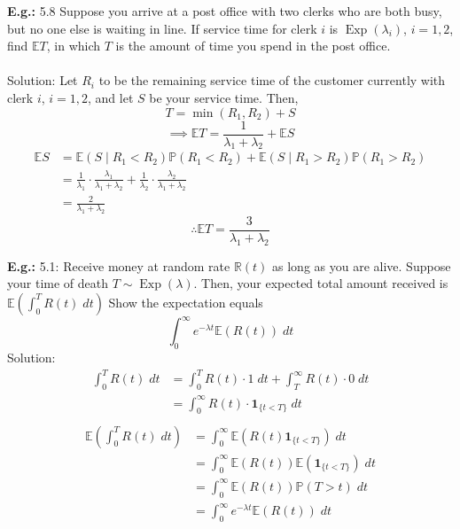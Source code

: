 \documentclass[a4paper]{article}
\newcommand{\n}{\hfill\break}
\newcommand{\eg}[1]{\par\noindent\settowidth{\hangindent}{\textbf{E.g.: }}\textbf{E.g.: }#1\n}
\newcommand{\reals}{\mathbb{R}}
\newcommand{\R}{\reals}
\newcommand{\Prob}{\mathbb{P}}
\renewcommand{\P}{\Prob}
\newcommand{\Avg}{\mathbb{E}}
\newcommand{\E}{\Avg}
\DeclareMathOperator{\Exp}{\text{Exp}}
\begin{document}
\eg{
5.8 Suppose you arrive at a post office with two clerks who are both busy, but no one else is waiting in line. If service time for clerk $i$ is $\Exp(\lambda_i)$, $i=1, 2$, find $\E T$, in which $T$ is the amount of time you spend in the post office.
\\\\
Solution: Let $R_i$ to be the remaining service time of the customer currently with clerk $i$, $i=1,2$, and let $S$ be your service time. Then, 
\[T=\min(R_1, R_2)+S\]
\[\implies\E T=\frac{1}{\lambda_1+\lambda_2}+\E S\]
\begin{align*}
    \E S&=\E(S\mid R_1<R_2)\P(R_1<R_2)+\E(S\mid R_1>R_2)\P(R_1>R_2) \\
    &=\frac{1}{\lambda_1}\cdot\frac{\lambda_1}{\lambda_1+\lambda_2}+\frac{1}{\lambda_2}\cdot\frac{\lambda_2}{\lambda_1+\lambda_2} \\
    &=\frac{2}{\lambda_1+\lambda_2}
\end{align*}
\[\therefore \E T=\frac{3}{\lambda_1+\lambda_2}\]
}

\eg{
5.1: Receive money at random rate $\R(t)$ as long as you are alive. Suppose your time of death $T\sim\Exp(\lambda)$. Then, your expected total amount received is $\E(\int^T_0R(t)\;dt)$ Show the expectation equals 
\[\int^\infty_0 e^{-\lambda t}\E(R(t))\;dt\]
Solution:
\begin{align*}
    \int^T_0 R(t)\;dt&=\int^T_0 R(t)\cdot1\;dt+\int^\infty_T R(t)\cdot0\;dt \\
    &=\int^\infty_0 R(t)\cdot\textbf{1}_{\{t<T\}}\;dt \\
\end{align*}
\begin{align*}
    \E\left(\int^T_0 R(t)\;dt\right)&=\int^\infty_0 \E\left(R(t)\textbf{1}_{\{t<T\}}\right)\;dt \\
    &=\int^\infty_0 \E(R(t))\E\left(\textbf{1}_{\{t<T\}}\right)\;dt \\
    &=\int^\infty_0 \E(R(t))\P(T>t)\;dt \\
    &=\int^\infty_0 e^{-\lambda t}\E(R(t))\;dt
\end{align*}
}
\end{document}
